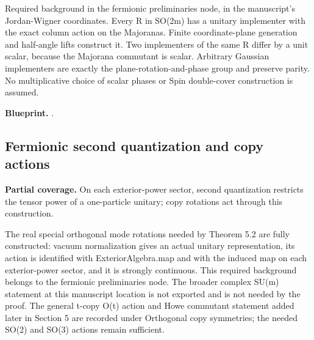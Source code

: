 Required background in the fermionic preliminaries node, in the manuscript's Jordan-Wigner coordinates. Every R in SO(2m) has a unitary implementer with the exact column action on the Majoranas. Finite coordinate-plane generation and half-angle lifts construct it. Two implementers of the same R differ by a unit scalar, because the Majorana commutant is scalar. Arbitrary Gaussian implementers are exactly the plane-rotation-and-phase group and preserve parity. No multiplicative choice of scalar phases or Spin double-cover construction is assumed.


\textbf{Blueprint.} .

\subsection{Fermionic second quantization and copy actions}\label{paper:fermion-second-quantization}
\textbf{Partial coverage.} On each exterior-power sector, second quantization restricts the tensor power of a one-particle unitary; copy rotations act through this construction. 

The real special orthogonal mode rotations needed by Theorem 5.2 are fully constructed: vacuum normalization gives an actual unitary representation, its action is identified with ExteriorAlgebra.map and with the induced map on each exterior-power sector, and it is strongly continuous. This required background belongs to the fermionic preliminaries node. The broader complex SU(m) statement at this manuscript location is not exported and is not needed by the proof. The general t-copy O(t) action and Howe commutant statement added later in Section 5 are recorded under Orthogonal copy symmetries; the needed SO(2) and SO(3) actions remain sufficient.

